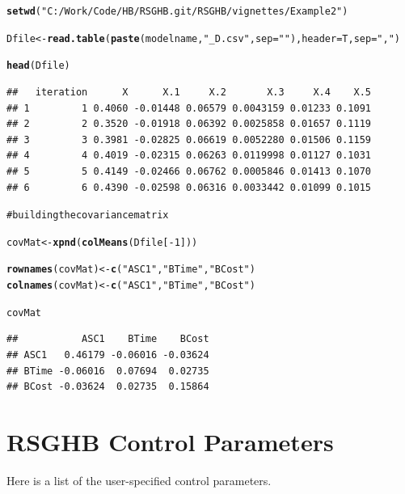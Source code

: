 \documentclass{article}\usepackage{graphicx, color}
\makeatletter
\newcommand{\hlfunctioncall}[1]{\textcolor[rgb]{0.501960784313725,0,0.329411764705882}{\textbf{#1}}}%
\newcommand{\hlstring}[1]{\textcolor[rgb]{0.6,0.6,1}{#1}}%
\newcommand{\hlcomment}[1]{\textcolor[rgb]{0.180392156862745,0.6,0.341176470588235}{#1}}%
\newenvironment{kframe}{%
 \def\at@end@of@kframe{}%
 \ifinner\ifhmode%
  \def\at@end@of@kframe{\end{minipage}}%
  \begin{minipage}{\columnwidth}%
 \fi\fi%
 \def\FrameCommand##1{\hskip\@totalleftmargin \hskip-\fboxsep
 \colorbox{shadecolor}{##1}\hskip-\fboxsep
     \hskip-\linewidth \hskip-\@totalleftmargin \hskip\columnwidth}%
 \MakeFramed {\advance\hsize-\width
   \@totalleftmargin\z@ \linewidth\hsize
   \@setminipage}}%
 {\par\unskip\endMakeFramed%
 \at@end@of@kframe}
\newenvironment{knitrout}{}{} %
\makeatother
\begin{document}
\begin{knitrout}
\color{fgcolor}\begin{kframe}
\begin{alltt}

\hlfunctioncall{setwd}(\hlstring{"C:/Work/Code/HB/RSGHB.git/RSGHB/vignettes/Example2"})

Dfile <- \hlfunctioncall{read.table}(\hlfunctioncall{paste}(modelname, \hlstring{"_D.csv"}, sep = \hlstring{""}), header = T, sep = \hlstring{","})

\hlfunctioncall{head}(Dfile)
\end{alltt}
\begin{verbatim}
##   iteration      X      X.1     X.2       X.3     X.4    X.5
## 1         1 0.4060 -0.01448 0.06579 0.0043159 0.01233 0.1091
## 2         2 0.3520 -0.01918 0.06392 0.0025858 0.01657 0.1119
## 3         3 0.3981 -0.02825 0.06619 0.0052280 0.01506 0.1159
## 4         4 0.4019 -0.02315 0.06263 0.0119998 0.01127 0.1031
## 5         5 0.4149 -0.02466 0.06762 0.0005846 0.01413 0.1070
## 6         6 0.4390 -0.02598 0.06316 0.0033442 0.01099 0.1015
\end{verbatim}
\begin{alltt}

\hlcomment{# building the covariance matrix}

covMat <- \hlfunctioncall{xpnd}(\hlfunctioncall{colMeans}(Dfile[-1]))

\hlfunctioncall{rownames}(covMat) <- \hlfunctioncall{c}(\hlstring{"ASC1"}, \hlstring{"BTime"}, \hlstring{"BCost"})
\hlfunctioncall{colnames}(covMat) <- \hlfunctioncall{c}(\hlstring{"ASC1"}, \hlstring{"BTime"}, \hlstring{"BCost"})

covMat
\end{alltt}
\begin{verbatim}
##           ASC1    BTime    BCost
## ASC1   0.46179 -0.06016 -0.03624
## BTime -0.06016  0.07694  0.02735
## BCost -0.03624  0.02735  0.15864
\end{verbatim}
\end{kframe}
\end{knitrout}


\section*{RSGHB Control Parameters}

Here is a list of the user-specified control parameters.
\end{document}
